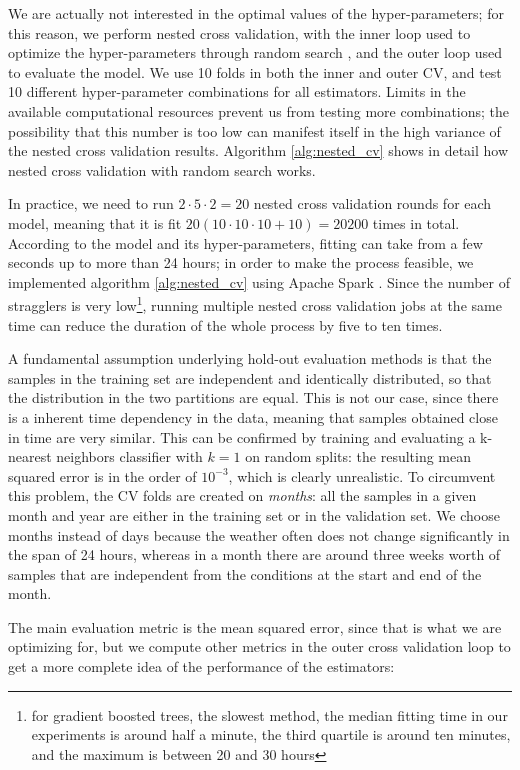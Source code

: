 \documentclass[12pt]{book}
\begin{document}
We are actually not interested in the optimal values of the hyper-parameters; for this reason, we perform nested cross validation, with the inner loop used to optimize the hyper-parameters through random search \citep{random_search}, and the outer loop used to evaluate the model. We use 10 folds in both the inner and outer CV, and test 10 different hyper-parameter combinations for all estimators. Limits in the available computational resources prevent us from testing more combinations; the possibility that this number is too low can manifest itself in the high variance of the nested cross validation results. Algorithm \ref{alg:nested_cv} shows in detail how nested cross validation with random search works.

In practice, we need to run $2\cdot5\cdot2=20$ nested cross validation rounds for each model, meaning that it is fit $20(10\cdot10\cdot10+10)=20200$ times in total. According to the model and its hyper-parameters, fitting can take from a few seconds up to more than 24 hours; in order to make the process feasible, we implemented algorithm \ref{alg:nested_cv} using Apache Spark \citep{spark}. Since the number of stragglers is very low\footnote{for gradient boosted trees, the slowest method, the median fitting time in our experiments is around half a minute, the third quartile is around ten minutes, and the maximum is between 20 and 30 hours}, running multiple nested cross validation jobs at the same time can reduce the duration of the whole process by five to ten times.

A fundamental assumption underlying hold-out evaluation methods is that the samples in the training set are independent and identically distributed, so that the distribution in the two partitions are equal. This is not our case, since there is a inherent time dependency in the data, meaning that samples obtained close in time are very similar. This can be confirmed by training and evaluating a k-nearest neighbors classifier with $k=1$ on random splits: the resulting mean squared error is in the order of $10^{-3}$, which is clearly unrealistic. To circumvent this problem, the CV folds are created on \emph{months}: all the samples in a given month and year are either in the training set or in the validation set. We choose months instead of days because the weather often does not change significantly in the span of 24 hours, whereas in a month there are around three weeks worth of samples that are independent from the conditions at the start and end of the month.

The main evaluation metric is the mean squared error, since that is what we are optimizing for, but we compute other metrics in the outer cross validation loop to get a more complete idea of the performance of the estimators:
\end{document}
